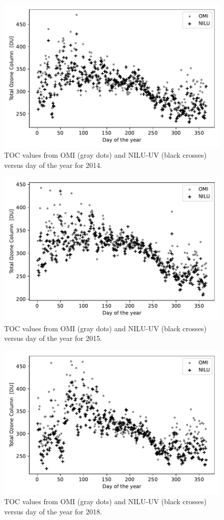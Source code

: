 \documentclass{optica-article}
\begin{document}
\begin{figure}[H]
	\centering
	\includegraphics[width=0.7\linewidth]{OMI_L3_NILU_O3_2014}
	\caption{TOC values from OMI (gray dots) and NILU-UV (black crosses) versus day of the year for 2014.}
	\label{fig:omil3niluo32014}
\end{figure}


\begin{figure}[H]
	\centering
	\includegraphics[width=0.7\linewidth]{OMI_L3_NILU_O3_2015}
	\caption{TOC values from OMI (gray dots) and NILU-UV (black crosses) versus day of the year for 2015.}
	\label{fig:omil3niluo32015}
\end{figure}

\begin{figure}[H]
	\centering
	\includegraphics[width=0.7\linewidth]{OMI_L3_NILU_O3_2018}
	\caption{TOC values from OMI (gray dots) and NILU-UV (black crosses) versus day of the year for 2018.}
	\label{fig:omil3niluo32018}
\end{figure}
\end{document}
